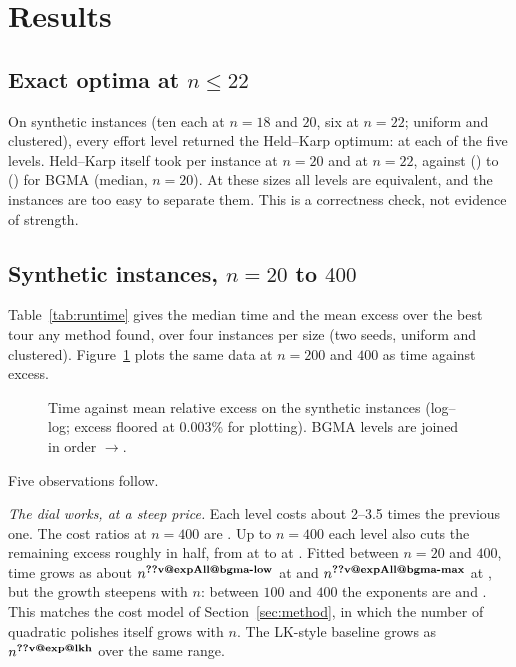 \section{Results}\label{sec:results}

\subsection{Exact optima at $n\le 22$}\label{sec:hk}
On  synthetic instances (ten each at $n=18$ and $20$, six at $n=22$; uniform and
clustered), every effort level returned the Held--Karp optimum:  at each of the five
levels. Held--Karp itself took  per instance at $n=20$ and  at $n=22$, against
 () to  () for BGMA (median, $n=20$). At
these sizes all levels are equivalent, and the instances are too easy to separate them. This is a
correctness check, not evidence of strength.

\subsection{Synthetic instances, $n=20$ to $400$}\label{sec:synthetic}
Table~\ref{tab:runtime} gives the median time and the mean excess over the best tour any method found,
over four instances per size (two seeds, uniform and clustered). Figure~\ref{fig:curve} plots the same
data at $n=200$ and $400$ as time against excess.

\begin{table}[t]
\centering\scriptsize
\caption{Synthetic instances: median solve time and mean relative excess over the best tour any method
found on the same instance (4 instances per cell). Excess is a \emph{relative} measure. At $n=20$ every
listed heuristic except greedy and Christofides is optimal (Section~\ref{sec:hk}).}
\label{tab:runtime}
\setlength{\tabcolsep}{3pt}

\end{table}

\begin{figure}[t]
\centering

\caption{Time against mean relative excess on the synthetic instances (log--log; excess floored at
0.003\% for plotting). BGMA levels are joined in order $\to$.}
\label{fig:curve}
\end{figure}

Five observations follow.

\emph{The dial works, at a steep price.} Each level costs about 2--3.5 times the previous one. The cost
ratios at $n=400$ are . Up to $n=400$ each level also cuts the remaining excess roughly in
half, from  at  to  at . Fitted between
$n=20$ and $400$, time grows as about $n^{\val{expAll@bgma-low}}$ at  and
$n^{\val{expAll@bgma-max}}$ at , but the growth steepens with $n$: between $100$ and $400$ the
exponents are  and . This matches the cost model of
Section~\ref{sec:method}, in which the number of quadratic polishes itself grows with $n$. The
LK-style baseline grows as $n^{\val{exp@lkh}}$ over the same range.

